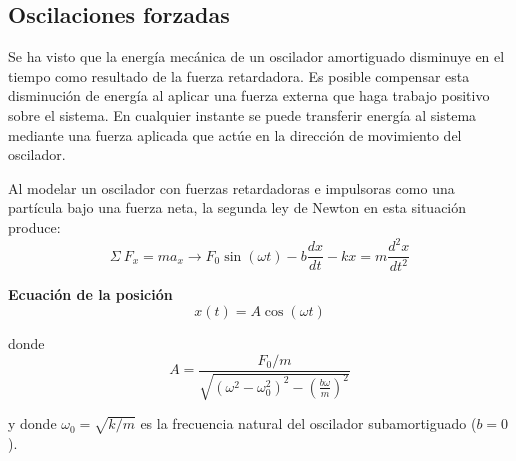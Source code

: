 \subsection{Oscilaciones forzadas}

  \PN Se ha visto que la energía mecánica de un oscilador amortiguado disminuye en el tiempo como resultado de la fuerza
  retardadora. Es posible compensar esta disminución de energía al aplicar una fuerza externa que haga trabajo positivo
  sobre el  sistema. En cualquier instante se puede transferir energía al sistema mediante una fuerza aplicada que actúe
  en la dirección de movimiento del oscilador.

  \PN Al modelar un oscilador con fuerzas retardadoras e impulsoras como una partícula bajo una fuerza neta, la segunda
  ley de Newton en esta situación produce:
  \begin{equation}
    \Sigma \ F_{x} = ma_{x} \rightarrow F_{0} \sin (\omega t) -b \frac{dx}{dt} - kx = m \frac{d^{2}x}{dt^{2}}
  \end{equation}

  \PN \textbf{Ecuación de la posición}
  \begin{equation}
    x(t) = A \cos (\omega t)
  \end{equation}

  \PN donde
  \begin{equation}
    A = \frac{F_{0}/m}{\sqrt{\left(\omega^{2} - \omega_{0}^{2}\right)^{2} - \left(\frac{b\omega}{m}\right)^{2}}}
  \end{equation}

  \PN y donde $\omega_{0} = \sqrt{k/m}$ es la frecuencia natural del oscilador subamortiguado ($b = 0$).
